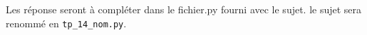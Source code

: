Les réponse seront à compléter dans le fichier.py fourni avec le sujet. le sujet sera renommé en \texttt{tp_14_nom.py}.
